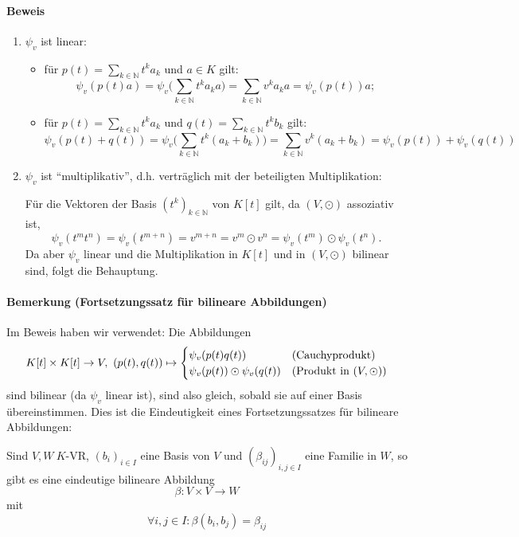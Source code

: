 \paragraph{Beweis}
	\begin{enumerate}
		\item $ \psi_v $ ist linear:
			\begin{itemize}
				\item für $ p(t) = \sum_{k\in\mathbb{N}} t^ka_k $ und $ a\in K $ gilt:
					\[ \psi_v(p(t)a) = \psi_v\Big(\sum_{k\in\mathbb{N}} t^ka_ka\Big) = \sum_{k\in\mathbb{N}} v^ka_ka = \psi_v(p(t))a; \]
				\item für $ p(t) = \sum_{k\in\mathbb{N}} t^ka_k $ und $ q(t) = \sum_{k\in\mathbb{N}} t^k b_k $ gilt:
					\[ \psi_v(p(t)+q(t)) = \psi_v\Big(\sum_{k\in\mathbb{N}}t^k(a_k+b_k)\Big) = \sum_{k\in\mathbb{N}} v^k(a_k+b_k) = \psi_v(p(t))+\psi_v(q(t)) \]
			\end{itemize}
		\item $ \psi_v $ ist "`multiplikativ"', d.h. verträglich mit der beteiligten Multiplikation:
		
			Für die Vektoren der Basis $ (t^k)_{k\in\mathbb{N}} $ von $ K[t] $ gilt, da $ (V,\odot) $ assoziativ ist,
				\[ \psi_v(t^mt^n) = \psi_v(t^{m+n}) = v^{m+n} = v^m\odot v^n = \psi_v(t^m)\odot \psi_v(t^n). \]
			Da aber $ \psi_v $ linear und die Multiplikation in $ K[t] $ und in $ (V,\odot) $ bilinear sind, folgt die Behauptung.
	\end{enumerate}
\paragraph{Bemerkung (Fortsetzungssatz für bilineare Abbildungen)}
	Im Beweis haben wir verwendet: Die Abbildungen
		\[ K[t]\times K[t]\to V,\ (p(t),q(t))\mapsto
			\begin{cases}
			\psi_v(p(t)q(t)) &\text{(Cauchyprodukt)}\\
			\psi_v(p(t))\odot \psi_v(q(t)) &\text{(Produkt in $ (V,\odot) $)}
			\end{cases} \]
	sind bilinear (da $ \psi_v $ linear ist), sind also gleich, sobald sie auf einer Basis übereinstimmen.
	Dies ist die Eindeutigkeit eines Fortsetzungssatzes für bilineare Abbildungen:
	
	\begin{Satz}
	Sind $ V,W\ K$-VR, $ (b_i)_{i\in I} $ eine Basis von $ V $ und $ (\beta_{ij})_{i,j\in I} $ eine Familie in $ W $, so gibt es eine eindeutige bilineare Abbildung
		\[ \beta: V\times V\to W \]
	mit
		\[ \forall i,j\in I: \beta(b_i,b_j) = \beta_{ij} \]
	\end{Satz}
	
